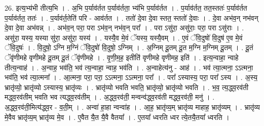 \documentclass[17pt]{extarticle}
\begin{document}
26. इत्य॒भ्य॑भी तीत्य॒भि । . अ॒भि प॒र्याव॑र्तत प॒र्याव॑र्तता॒ भ्य॑भि प॒र्याव॑र्तत । . प॒र्याव॑र्तत॒ तत॒स्ततः॑ प॒र्याव॑र्तत प॒र्याव॑र्तत॒ ततः॑ । . प॒र्याव॑र्त॒तेति॑ परि - आव॑र्तत । . ततो॑ दे॒वा दे॒वा स्तत॒ स्ततो॑ दे॒वाः । . दे॒वा अभ॑व॒न् नभ॑वन् दे॒वा दे॒वा अभ॑वन्न् । . अभ॑व॒न् परा॒ परा ऽभ॑व॒न् नभ॑व॒न् परा᳚ । . परा ऽसु॑रा॒ असु॑राः॒ परा॒ परा ऽसु॑राः । . असु॑रा॒ यस्य॒ यस्या सु॑रा॒ असु॑रा॒ यस्य॑ । . यस्यै॒व मे॒वं ॅयस्य॒ यस्यै॒वम् । . ए॒वं ॅवि॒दुषो॑ वि॒दुष॑ ए॒व मे॒वं ॅवि॒दुषः॑ । . वि॒दुषो॒ ऽग्नि म॒ग्निं ॅवि॒दुषो॑ वि॒दुषो॒ ऽग्निम् । . अ॒ग्निम् दू॒तम् दू॒त म॒ग्नि म॒ग्निम् दू॒तम् । . दू॒तं ॅवृ॑णीमहे वृणीमहे दू॒तम् दू॒तं ॅवृ॑णीमहे । . वृ॒णी॒म॒ह॒ इतीति॑ वृणीमहे वृणीमह॒ इति॑ । . इत्य॒न्वाहा॒ न्वाहे तीत्य॒न्वाह॑ । . अ॒न्वाह॒ भव॑ति॒ भव॑ त्य॒न्वाहा॒ न्वाह॒ भव॑ति । . अ॒न्वाहेत्य॑नु - आह॑ । . भव॑ त्या॒त्मना॒ ऽऽत्मना॒ भव॑ति॒ भव॑ त्या॒त्मना᳚ । . आ॒त्मना॒ परा॒ परा॒ ऽऽत्मना॒ ऽऽत्मना॒ परा᳚ । . परा᳚ ऽस्यास्य॒ परा॒ परा᳚ ऽस्य । . अ॒स्य॒ भ्रातृ॑व्यो॒ भ्रातृ॑व्यो ऽस्यास्य॒ भ्रातृ॑व्यः । . भ्रातृ॑व्यो भवति भवति॒ भ्रातृ॑व्यो॒ भ्रातृ॑व्यो भवति । . भ॒व॒ त्य॒द्ध्व॒रव॑ती मद्ध्व॒रव॑तीम् भवति भव त्यद्ध्व॒रव॑तीम् । . अ॒द्ध्व॒रव॑ती॒ मन्वन्व॑द्ध्व॒रव॑ती मद्ध्व॒रव॑ती॒ मनु॑ । . अ॒द्ध्व॒रव॑ती॒मित्य॑द्ध्व॒र - व॒ती॒म् । . अन्वा॑ हा॒हा न्वन्वा॑ह । . आ॒ह॒ भ्रातृ॑व्य॒म् भ्रातृ॑व्य माहाह॒ भ्रातृ॑व्यम् । . भ्रातृ॑व्य मे॒वैव भ्रातृ॑व्य॒म् भ्रातृ॑व्य मे॒व । . ए॒वैत यै॒त यै॒वै वैतया᳚ । . ए॒तया᳚ ध्वरति ध्वर त्ये॒तयै॒तया᳚ ध्वरति । \newline
\end{document}
